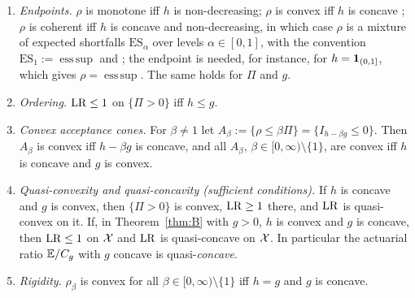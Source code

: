 \begin{corollary}\label{cor:shape}
\begin{enumerate}[label=(\alph*)]
\item \emph{Endpoints.} $\rho$ is monotone iff $h$ is non-decreasing; $\rho$ is convex iff $h$ is concave
  \citep[Thm.~3]{www2020}; $\rho$ is coherent iff $h$ is concave and non-decreasing, in which case $\rho$ is a
  mixture of expected shortfalls $\mathrm{ES}_\alpha$ over levels $\alpha\in[0,1]$, with the convention
  $\mathrm{ES}_1:=\operatorname{ess\,sup}$ \citep{kusuoka2001,jst2006,folmerschied2016} and \citet[Thm.~5]{www2020b}; the endpoint is needed, for
  instance, for $h=\mathbf 1_{(0,1]}$, which gives $\rho=\operatorname{ess\,sup}$. The same holds for $\Pi$ and $g$.
\item \emph{Ordering.} $\mathrm{LR}\le1$ on $\{\Pi>0\}$ iff $h\le g$.
\item \emph{Convex acceptance cones.} For $\beta\ne1$ let $A_\beta:=\{\rho\le\beta\Pi\}=\{I_{h-\beta g}\le0\}$.
  Then $A_\beta$ is convex iff $h-\beta g$ is concave, and all $A_\beta$, $\beta\in[0,\infty)\setminus\{1\}$, are
  convex iff $h$ is concave and $g$ is convex.
\item \emph{Quasi-convexity and quasi-concavity (sufficient conditions).}
  If $h$ is concave and $g$ is convex, then $\{\Pi>0\}$ is convex, $\mathrm{LR}\ge1$ there, and $\mathrm{LR}$ is quasi-convex on it.
  If, in Theorem~\ref{thm:B} with $g>0$, $h$ is convex and $g$ is concave, then $\mathrm{LR}\le1$ on $\mathcal X$ and $\mathrm{LR}$ is
  quasi-concave on $\mathcal X$. In particular the actuarial ratio $\mathbb E/C_g$ with $g$ concave is quasi-\emph{concave}.
\item \emph{Rigidity.} $\rho_\beta$ is convex for all $\beta\in[0,\infty)\setminus\{1\}$ iff $h=g$ and $g$ is concave.
\end{enumerate}
\end{corollary}


